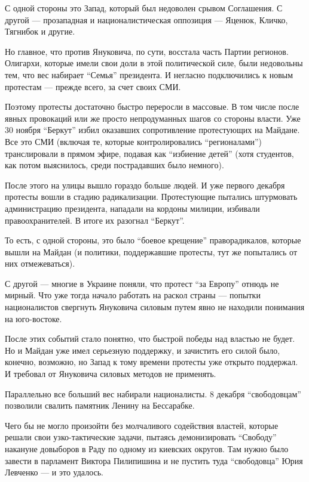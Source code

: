 С одной стороны это Запад, который был недоволен срывом Соглашения. С
другой --- прозападная и националистическая оппозиция --- Яценюк, Кличко,
Тягнибок и другие.

Но главное, что против Януковича, по сути, восстала часть Партии регионов.
Олигархи, которые имели свои доли в этой политической силе, были
недовольны тем, что вес набирает \enquote{Семья} президента. И негласно
подключились к новым протестам --- прежде всего, за счет своих СМИ. 

Поэтому протесты достаточно быстро переросли в массовые. В том числе после
явных провокаций или же просто непродуманных шагов со стороны власти. Уже
30 ноября \enquote{Беркут} избил оказавших сопротивление протестующих на Майдане.
Все это СМИ (включая те, которые контролировались \enquote{регионалами})
транслировали в прямом эфире, подавая как \enquote{избиение детей} (хотя
студентов, как потом выяснилось, среди пострадавших было немного). 

После этого на улицы вышло гораздо больше людей. И уже первого декабря
протесты вошли в стадию радикализации. Протестующие пытались штурмовать
администрацию президента, нападали на кордоны милиции, избивали
правоохранителей. В итоге их разогнал \enquote{Беркут}. 

То есть, с одной стороны, это было \enquote{боевое крещение} праворадикалов,
которые вышли на Майдан (и политики, поддержавшие протесты, тут же
попытались от них отмежеваться).

С другой --- многие в Украине поняли, что протест \enquote{за Европу} отнюдь не
мирный. Что уже тогда начало работать на раскол страны --- попытки
националистов свергнуть Януковича силовым путем явно не находили понимания
на юго-востоке.

После этих событий стало понятно, что быстрой победы над властью не будет.
Но и Майдан уже имел серьезную поддержку, и зачистить его силой было,
конечно, возможно, но Запад к тому времени протесты уже открыто поддержал.
И требовал от Януковича силовых методов не применять.

Параллельно все больший вес набирали националисты. 8 декабря \enquote{свободовцам}
позволили свалить памятник Ленину на Бессарабке.

Чего бы не могло произойти без молчаливого содействия властей, которые
решали свои узко-тактические задачи, пытаясь демонизировать \enquote{Свободу}
накануне довыборов в Раду по одному из киевских округов. Там нужно было
завести в парламент Виктора Пилипишина и не пустить туда \enquote{свободовца} Юрия
Левченко --- и это удалось.

